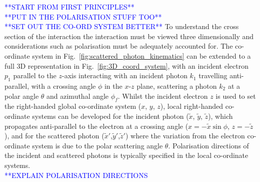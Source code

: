 \documentclass[../main.tex]{subfiles}
\begin{document}
\textcolor{blue}{**START FROM FIRST PRINCIPLES** \\ **PUT IN THE POLARISATION STUFF TOO**\\ **SET OUT THE CO-ORD SYSTEM BETTER**}
To understand the cross section of the interaction the interaction must be viewed three dimensionally and considerations such as polarisation must be adequately accounted for. The co-ordinate system in Fig.~\ref{fig:scattered_photon_kinematics} can be extended to a full 3D representation in Fig.~\ref{fig:3D_coord_system}, with an incident electron $p_{1}$ parallel to the $z$-axis interacting with an incident photon $k_{1}$ travelling anti-parallel, with a crossing angle $\phi$ in the $x$-$z$ plane, scattering a photon $k_{2}$ at a polar angle $\theta$ and azimuthal angle $\phi_{f}$. Whilst the incident electron $z$ is used to set the right-handed global co-ordinate system ($x$, $y$, $z$), local right-handed co-ordinate systems can be developed for the incident photon ($\tilde{x}$, $\tilde{y}$, $\tilde{z}$), which propagates anti-parallel to the electron at a crossing angle ($x = -\tilde{x}\sin\phi$, $z = -\tilde{z}$), and for the scattered photon ($\tilde{x}'$,$\tilde{y}'$,$\tilde{z}'$) where the variation from the electron co-ordinate system is due to the polar scattering angle $\theta$. Polarisation directions of the incident and scattered photons is typically specified in the local co-ordinate systems.  
\textcolor{blue}{\\ **EXPLAIN POLARISATION DIRECTIONS}
\end{document}
